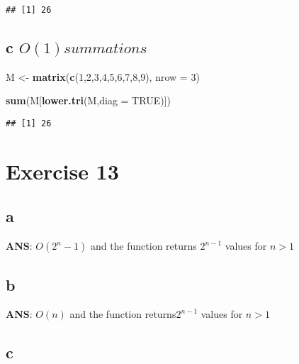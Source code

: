 \documentclass[
]{article}
\newenvironment{Shaded}{\begin{snugshade}}{\end{snugshade}}
\newcommand{\DataTypeTok}[1]{\textcolor[rgb]{0.13,0.29,0.53}{#1}}
\newcommand{\DecValTok}[1]{\textcolor[rgb]{0.00,0.00,0.81}{#1}}
\newcommand{\KeywordTok}[1]{\textcolor[rgb]{0.13,0.29,0.53}{\textbf{#1}}}
\newcommand{\NormalTok}[1]{#1}
\newcommand{\OtherTok}[1]{\textcolor[rgb]{0.56,0.35,0.01}{#1}}
\newcommand{\StringTok}[1]{\textcolor[rgb]{0.31,0.60,0.02}{#1}}
\begin{document}
\begin{verbatim}
## [1] 26
\end{verbatim}

\hypertarget{c-o1-summations}{%
\subsection{\texorpdfstring{c
\(O(1) summations\)}{c O(1) summations}}\label{c-o1-summations}}

\begin{Shaded}
\begin{Highlighting}[]
\NormalTok{M <-}\StringTok{ }\KeywordTok{matrix}\NormalTok{(}\KeywordTok{c}\NormalTok{(}\DecValTok{1}\NormalTok{,}\DecValTok{2}\NormalTok{,}\DecValTok{3}\NormalTok{,}\DecValTok{4}\NormalTok{,}\DecValTok{5}\NormalTok{,}\DecValTok{6}\NormalTok{,}\DecValTok{7}\NormalTok{,}\DecValTok{8}\NormalTok{,}\DecValTok{9}\NormalTok{), }\DataTypeTok{nrow =} \DecValTok{3}\NormalTok{)}

\KeywordTok{sum}\NormalTok{(M[}\KeywordTok{lower.tri}\NormalTok{(M,}\DataTypeTok{diag =} \OtherTok{TRUE}\NormalTok{)])}
\end{Highlighting}
\end{Shaded}

\begin{verbatim}
## [1] 26
\end{verbatim}

\hypertarget{exercise-13}{%
\section{Exercise 13}\label{exercise-13}}

\hypertarget{a-4}{%
\subsection{a}\label{a-4}}

\textbf{ANS}: \(O(2^{n}-1)\) and the function returns \(2^{n-1}\) values
for \(n>1\)

\hypertarget{b-4}{%
\subsection{b}\label{b-4}}

\textbf{ANS}: \(O(n)\) and the function returns\(2^{n-1}\) values for
\(n>1\)

\hypertarget{c-2}{%
\subsection{c}\label{c-2}}
\end{document}
